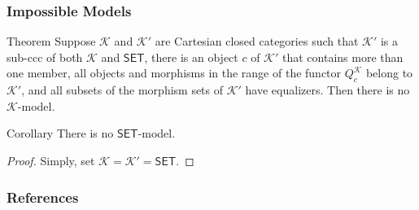 \watermarkon
\begin{frame}[fragile]
    \frametitle{Impossible Models}
    
    \begin{block}{Theorem}
		Suppose $\mathcal{K}$ and $\mathcal{K}'$ are Cartesian closed categories such that $\mathcal{K}'$ is a sub-ccc of both $\mathcal{K}$ and $\mathsf{SET}$, there is an object $c$ of $\mathcal{K}'$ that contains more than one member, all objects and morphisms in the range of the functor $Q_c^\mathcal{K}$ belong to $\mathcal{K}'$, and all subsets of the morphism sets of $\mathcal{K}'$ have equalizers. Then there is no $\mathcal{K}$-model.
	\end{block}
	
	\begin{block}{Corollary}
	    There is no $\mathsf{SET}$-model.
	\end{block}
	
	\begin{proof}
	Simply, set $\mathcal{K} = \mathcal{K}' = \mathsf{SET}$.
	\end{proof}
\end{frame}


\begin{frame}[t,allowframebreaks]
\nocite{*}
\frametitle{References}


\end{frame}
